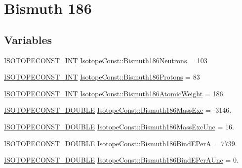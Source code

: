 \hypertarget{group___isotope_const-_bismuth-_bi186}{}\section{Bismuth 186}
\label{group___isotope_const-_bismuth-_bi186}
\subsection*{Variables}
\begin{DoxyCompactItemize}
\item 
\mbox{\hyperlink{group___isotope_const-_macros_ga5f18360b3e99483a35c32d789e62621c}{I\+S\+O\+T\+O\+P\+E\+C\+O\+N\+S\+T\+\_\+\+I\+NT}} \mbox{\hyperlink{group___isotope_const-_bismuth-_bi186_ga6683beeb11f9ded17e961421d3f8a72e}{Isotope\+Const\+::\+Bismuth186\+Neutrons}} = 103
\item 
\mbox{\hyperlink{group___isotope_const-_macros_ga5f18360b3e99483a35c32d789e62621c}{I\+S\+O\+T\+O\+P\+E\+C\+O\+N\+S\+T\+\_\+\+I\+NT}} \mbox{\hyperlink{group___isotope_const-_bismuth-_bi186_gaa15e512e320ab81fabafc28a8792ddf1}{Isotope\+Const\+::\+Bismuth186\+Protons}} = 83
\item 
\mbox{\hyperlink{group___isotope_const-_macros_ga5f18360b3e99483a35c32d789e62621c}{I\+S\+O\+T\+O\+P\+E\+C\+O\+N\+S\+T\+\_\+\+I\+NT}} \mbox{\hyperlink{group___isotope_const-_bismuth-_bi186_gabda316fb477cfb4dc9a2c18063a1133a}{Isotope\+Const\+::\+Bismuth186\+Atomic\+Weight}} = 186
\item 
\mbox{\hyperlink{group___isotope_const-_macros_ga8f45a7272ce02c0b4c65c44636ed719a}{I\+S\+O\+T\+O\+P\+E\+C\+O\+N\+S\+T\+\_\+\+D\+O\+U\+B\+LE}} \mbox{\hyperlink{group___isotope_const-_bismuth-_bi186_ga4d42caceb40d567a7d5470a291625244}{Isotope\+Const\+::\+Bismuth186\+Mass\+Exc}} = -\/3146.
\item 
\mbox{\hyperlink{group___isotope_const-_macros_ga8f45a7272ce02c0b4c65c44636ed719a}{I\+S\+O\+T\+O\+P\+E\+C\+O\+N\+S\+T\+\_\+\+D\+O\+U\+B\+LE}} \mbox{\hyperlink{group___isotope_const-_bismuth-_bi186_ga2929c049673be6096b12f3878ae80976}{Isotope\+Const\+::\+Bismuth186\+Mass\+Exc\+Unc}} = 16.
\item 
\mbox{\hyperlink{group___isotope_const-_macros_ga8f45a7272ce02c0b4c65c44636ed719a}{I\+S\+O\+T\+O\+P\+E\+C\+O\+N\+S\+T\+\_\+\+D\+O\+U\+B\+LE}} \mbox{\hyperlink{group___isotope_const-_bismuth-_bi186_ga8dc77cee63cac04113de2a253507bd28}{Isotope\+Const\+::\+Bismuth186\+Bind\+E\+PerA}} = 7739.
\item 
\mbox{\hyperlink{group___isotope_const-_macros_ga8f45a7272ce02c0b4c65c44636ed719a}{I\+S\+O\+T\+O\+P\+E\+C\+O\+N\+S\+T\+\_\+\+D\+O\+U\+B\+LE}} \mbox{\hyperlink{group___isotope_const-_bismuth-_bi186_ga9c11d278a3c7e1381cdd6ccc9c420507}{Isotope\+Const\+::\+Bismuth186\+Bind\+E\+Per\+A\+Unc}} = 0.

\end{DoxyCompactItemize}
